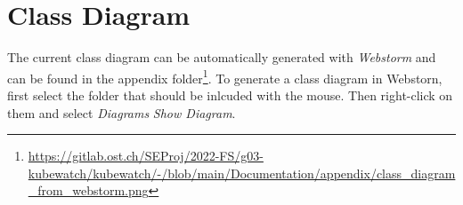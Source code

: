 \section{Class Diagram}
The current class diagram can be automatically generated with \textit{Webstorm} and can be found in the appendix
folder\footnote{\url{https://gitlab.ost.ch/SEProj/2022-FS/g03-kubewatch/kubewatch/-/blob/main/Documentation/appendix/class_diagram_from_webstorm.png}}.
To generate a class diagram in Webstorn, first select the folder that should be inlcuded with the mouse.
Then right-click on them and select \textit{Diagrams} \textrightarrow \textit{Show Diagram}.
